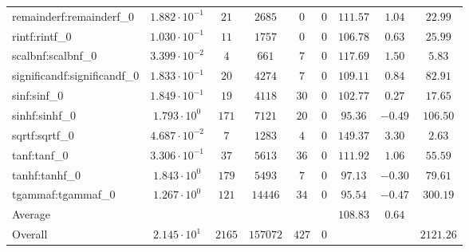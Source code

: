 \begin{tabular}{|l|c|c|c|c|c|c|c|c|}
remainderf:remainderf\_0     & $ 1.882 \cdot 10^{-1} $ & $ 21     $ & $ 2685   $ & $ 0   $ & $ 0   $ & $ 111.57      $ & $ 1.04    $ & $ 22.99   $ \\
rintf:rintf\_0               & $ 1.030 \cdot 10^{-1} $ & $ 11     $ & $ 1757   $ & $ 0   $ & $ 0   $ & $ 106.78      $ & $ 0.63    $ & $ 25.99   $ \\
scalbnf:scalbnf\_0           & $ 3.399 \cdot 10^{-2} $ & $ 4      $ & $ 661    $ & $ 7   $ & $ 0   $ & $ 117.69      $ & $ 1.50    $ & $ 5.83    $ \\
significandf:significandf\_0 & $ 1.833 \cdot 10^{-1} $ & $ 20     $ & $ 4274   $ & $ 7   $ & $ 0   $ & $ 109.11      $ & $ 0.84    $ & $ 82.91   $ \\
sinf:sinf\_0                 & $ 1.849 \cdot 10^{-1} $ & $ 19     $ & $ 4118   $ & $ 30  $ & $ 0   $ & $ 102.77      $ & $ 0.27    $ & $ 17.65   $ \\
sinhf:sinhf\_0               & $ 1.793 \cdot 10^{0}  $ & $ 171    $ & $ 7121   $ & $ 20  $ & $ 0   $ & $ 95.36       $ & $ -0.49   $ & $ 106.50  $ \\
sqrtf:sqrtf\_0               & $ 4.687 \cdot 10^{-2} $ & $ 7      $ & $ 1283   $ & $ 4   $ & $ 0   $ & $ 149.37      $ & $ 3.30    $ & $ 2.63    $ \\
tanf:tanf\_0                 & $ 3.306 \cdot 10^{-1} $ & $ 37     $ & $ 5613   $ & $ 36  $ & $ 0   $ & $ 111.92      $ & $ 1.06    $ & $ 55.59   $ \\
tanhf:tanhf\_0               & $ 1.843 \cdot 10^{0}  $ & $ 179    $ & $ 5493   $ & $ 7   $ & $ 0   $ & $ 97.13       $ & $ -0.30   $ & $ 79.61   $ \\
tgammaf:tgammaf\_0           & $ 1.267 \cdot 10^{0}  $ & $ 121    $ & $ 14446  $ & $ 34  $ & $ 0   $ & $ 95.54       $ & $ -0.47   $ & $ 300.19  $ \\
\hline
Average                      & $                     $ & $        $ & $        $ & $     $ & $     $ & $ 108.83      $ & $ 0.64    $ & $         $ \\
\hline
Overall                      & $ 2.145 \cdot 10^{1}  $ & $ 2165   $ & $ 157072 $ & $ 427 $ & $ 0   $ & $             $ & $         $ & $ 2121.26 $ \\
\hline
\end{tabular}

